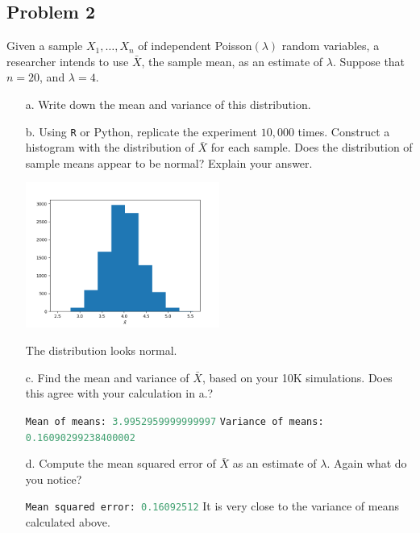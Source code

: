 \documentclass{article}
\newcommand{\1}{\mathbf{1}}
\begin{document}
\subsection*{Problem 2}
Given a sample $X_1,\ldots , X_n$  of independent Poisson$(\lambda)$ random variables, a researcher  intends to use $\bar{X}$, the sample mean, as an estimate of $\lambda$.  Suppose that $n=20$, and $\lambda=4$.
\begin{itemize}
    \item[a.] Write down the mean and variance of this distribution.
    
    \item[b.] Using {\tt R} or Python, replicate the experiment $10,000$ times. Construct a histogram with the distribution of $\bar{X}$ for each sample. Does the distribution of sample means appear to be normal? Explain your answer.
    
    \begin{center}
        \includegraphics[width=0.5\textwidth]{STATS509/HW7/HW7Figures/Problem2.png}
    \end{center}
    
    The distribution looks normal. 
    
    
    \item[c.] Find the mean and variance of $\bar{X}$, based on your 10K simulations. Does this agree with your calculation in a.?
    
    \lstinline[language=Python]{Mean of means: 3.9952959999999997}\newline
    \lstinline[language=Python]{Variance of means: 0.16090299238400002}
    
    \item[d.] Compute the mean squared error of $\bar{X}$ as an estimate of $\lambda$. Again what do you notice? 
    
    \lstinline[language=Python]{Mean squared error: 0.16092512} \newline
    It is very close to the variance of means calculated above. 
\end{itemize}
\end{document}
